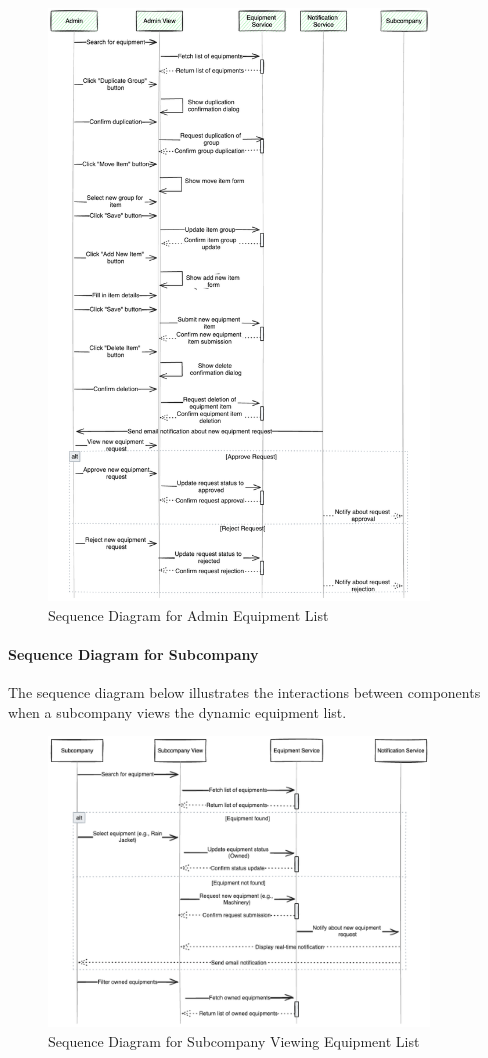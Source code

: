 \begin{figure}[H]
    \centering
    \includegraphics[width=0.9\textwidth]{src/assets/diagrams/adminEquipementList.png}
    \caption{Sequence Diagram for Admin Equipment List}
    \label{fig:sequence_diagram_admin}
\end{figure}

\paragraph{Sequence Diagram for Subcompany}
The sequence diagram below illustrates the interactions between components when a subcompany views the dynamic equipment list.

\begin{figure}[H]
    \centering
    \includegraphics[width=0.9\textwidth]{src/assets/diagrams/SubcompanyEquipement.png}
    \caption{Sequence Diagram for Subcompany Viewing Equipment List}
    \label{fig:sequence_diagram_subcompany}
\end{figure}
